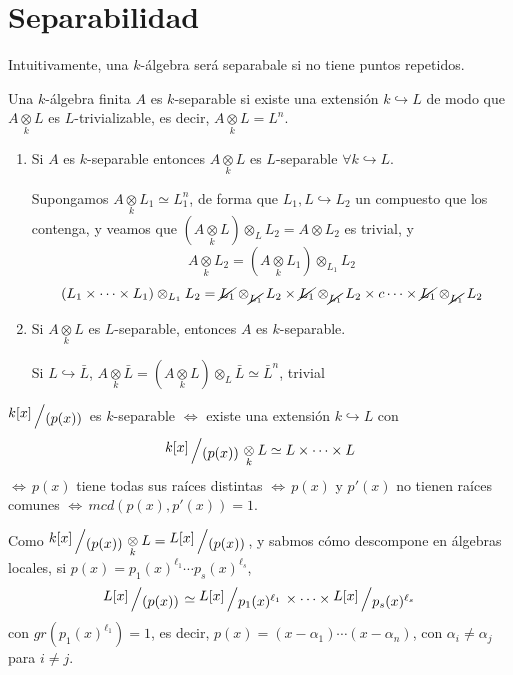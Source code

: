 \section{Separabilidad} 
Intuitivamente, una $k$-\'algebra ser\'a separabale si no tiene puntos repetidos.
\begin{defi}
    Una $k$-\'algebra finita $A$ es $k$-separable si existe una extensi\'on $k \hookrightarrow L$ de modo que $A \underset{k}{\otimes} L$ es $L$-trivializable, es decir, $A \underset{k}{\otimes} L = L^n$. 
\end{defi}
\begin{propis}
\begin{enumerate}
    \item Si $A$ es $k$-separable entonces $A \underset{k}{\otimes} L$ es $L$-separable $\forall k \hookrightarrow L$.
    \begin{dem}
        Supongamos $A \underset{k}{\otimes} L_1 \simeq L_1^n$, de forma que $L_1, L \hookrightarrow L_2$ un compuesto que los contenga, y veamos que $(A \underset{k}{\otimes} L)\otimes_L L_2 = A \otimes L_2$ es trivial, y 
        $$A \underset{k}{\otimes} L_2 = (A \underset{k}{\otimes} L_1) \otimes_{L_1} L_2$$
        $$(L_1 \times \cdots \times L_1)\otimes_{L_1} L_2 = \cancel{L_1} \otimes_{\cancel{L_1}} L_2 \times \cancel{L_1} \otimes_{\cancel{L_1}} L_2  \times c\dots \times \cancel{L_1} \otimes_{\cancel{L_1}} L_2 $$
    \end{dem}
    \item Si $A \underset{k}{\otimes} L$ es $L$-separable, entonces $A$ es $k$-separable.
    \begin{dem}
        Si $L \hookrightarrow \bar L$, $A \underset{k}{\otimes} \bar L = (A \underset{k}{\otimes} L)\otimes_{L} \bar L \simeq \bar L ^n$, trivial
    \end{dem}
\end{enumerate}
\end{propis}
\begin{ejem}
    $\modulo{k[x]}{(p(x))}$ es $k$-separable $\iff$ existe una extensi\'on $k \hookrightarrow L$ con $$\modulo{k[x]}{(p(x))} \underset{k}{\otimes} L \simeq L \times \cdots \times L$$
    $\iff \, p(x)$ tiene todas sus ra\'ices distintas $\iff \, p(x)$ y $p'(x)$ no tienen ra\'ices comunes $\iff\, mcd(p(x), p'(x)) =1$.   
\end{ejem}
\begin{dem}
    Como $\modulo{k[x]}{(p(x))} \underset{k}{\otimes} L  = \modulo{L[x]}{(p(x))}$, y sabmos c\'omo descompone en \'algebras locales, si $p(x) = p_1(x)^{\ell_1} \cdots p_s(x)^{\ell_s}$, 
    $$\modulo{L[x]}{(p(x))} \simeq \modulo{L[x]}{p_1(x)^{\ell_1}} \times \cdots \times \modulo{L[x]}{p_s(x)^{\ell_s}} $$
    con $gr(p_1(x)^{\ell_1})=1$, es decir, $p(x) = (x-\alpha_1) \cdots (x-\alpha_n)$, con $\alpha_ i \neq \alpha_j$ para $i \neq j$.
\end{dem}
